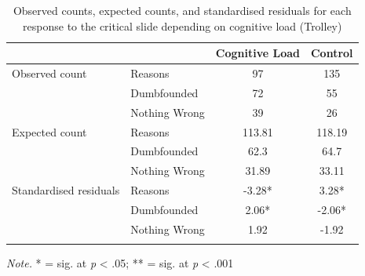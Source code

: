 \documentclass[
  american,
  man,floatsintext]{apa7}
\begin{document}
\begin{table}[tbp]

\begin{center}
\begin{threeparttable}

\caption{\label{tab:tabS6tab1dumbTrolley}Observed counts, expected counts, and standardised residuals for each response to the critical slide depending on cognitive load (Trolley)}

\begin{tabular}{llcc}
\toprule
 & \multicolumn{1}{c}{} & \multicolumn{1}{c}{Cognitive Load} & \multicolumn{1}{c}{Control}\\
\midrule
Observed count & Reasons & 97 & 135\\
 & Dumbfounded & 72 & 55\\
 & Nothing Wrong & 39 & 26\\
Expected count & Reasons & 113.81 & 118.19\\
 & Dumbfounded & 62.3 & 64.7\\
 & Nothing Wrong & 31.89 & 33.11\\
Standardised residuals & Reasons & -3.28* & 3.28*\\
 & Dumbfounded & 2.06* & -2.06*\\
 & Nothing Wrong & 1.92 & -1.92\\
\bottomrule
\addlinespace
\end{tabular}

\begin{tablenotes}[para]
\normalsize{\textit{Note.} * = sig. at \emph{p} < .05; ** = sig. at \emph{p} < .001}
\end{tablenotes}

\end{threeparttable}
\end{center}

\end{table}
\end{document}
